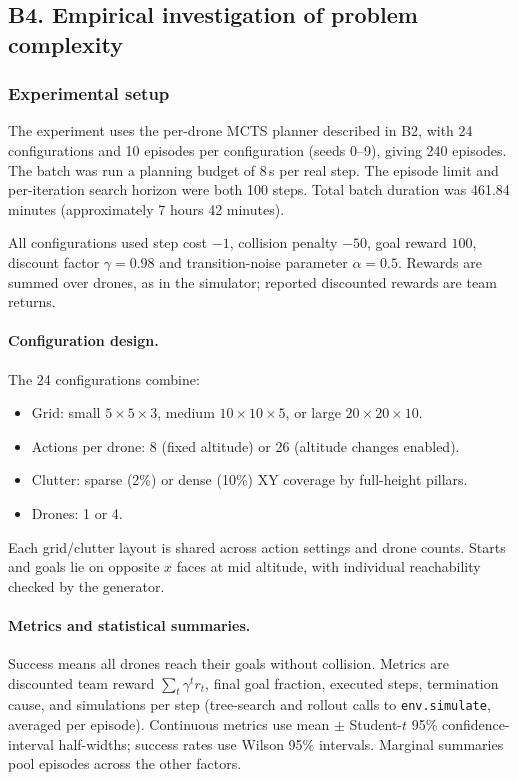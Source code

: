 \documentclass[11pt,a4paper]{article}
\begin{document}
\subsection*{B4. Empirical investigation of problem complexity}

\subsubsection*{Experimental setup}
The experiment uses the per-drone MCTS planner described in B2, with 24 configurations and 10 episodes per configuration (seeds 0--9), giving 240 episodes. The batch was run a planning budget of 8\,s per real step. The episode limit and per-iteration search horizon were both 100 steps. Total batch duration was 461.84 minutes (approximately 7 hours 42 minutes).

All configurations used step cost $-1$, collision penalty $-50$, goal reward $100$, discount factor $\gamma=0.98$ and transition-noise parameter $\alpha=0.5$. Rewards are summed over drones, as in the simulator; reported discounted rewards are team returns.

\paragraph{Configuration design.}
The 24 configurations combine:
\begin{itemize}[nosep]
  \item Grid: small $5\times5\times3$, medium $10\times10\times5$, or large $20\times20\times10$.
  \item Actions per drone: 8 (fixed altitude) or 26 (altitude changes enabled).
  \item Clutter: sparse (2\%) or dense (10\%) XY coverage by full-height pillars.
  \item Drones: 1 or 4.
\end{itemize}
Each grid/clutter layout is shared across action settings and drone counts. Starts and goals lie on opposite $x$ faces at mid altitude, with individual reachability checked by the generator.

\paragraph{Metrics and statistical summaries.}
Success means all drones reach their goals without collision. Metrics are discounted team reward $\sum_t\gamma^t r_t$, final goal fraction, executed steps, termination cause, and simulations per step (tree-search and rollout calls to \texttt{env.simulate}, averaged per episode). Continuous metrics use mean $\pm$ Student-$t$ 95\% confidence-interval half-widths; success rates use Wilson 95\% intervals. Marginal summaries pool episodes across the other factors.
\end{document}
